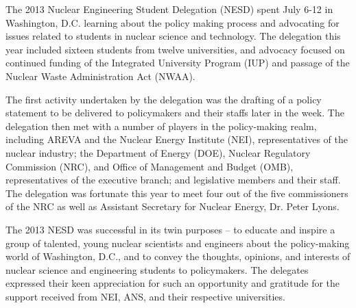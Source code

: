 

The 2013 Nuclear Engineering Student Delegation (NESD) spent July 6-12 in
Washington, D.C. learning about the policy making process and advocating for
issues related to students in nuclear science and technology. The delegation
this year included sixteen students from twelve universities, and advocacy
focused on continued funding of the Integrated University Program (IUP) and
passage of the Nuclear Waste Administration Act (NWAA).

The first activity undertaken by the delegation was the drafting of a policy
statement to be delivered to policymakers and their staffs later in the
week. The delegation then met with a number of players in the policy-making
realm, including AREVA and the Nuclear Energy Institute (NEI), representatives
of the nuclear industry; the Department of Energy (DOE), Nuclear Regulatory
Commission (NRC), and Office of Management and Budget (OMB), representatives of
the executive branch; and legislative members and their staff. The delegation
was fortunate this year to meet four out of the five commissioners of the NRC as
well as Assistant Secretary for Nuclear Energy, Dr. Peter Lyons.

The 2013 NESD was successful in its twin purposes -- to educate and inspire a
group of talented, young nuclear scientists and engineers about the
policy-making world of Washington, D.C., and to convey the thoughts, opinions,
and interests of nuclear science and engineering students to policymakers. The
delegates expressed their keen appreciation for such an opportunity and
gratitude for the support received from NEI, ANS, and their respective
universities.
